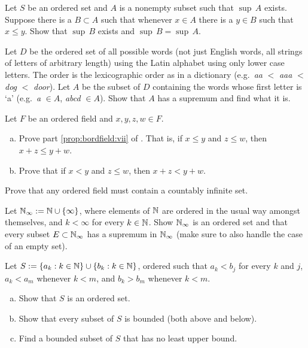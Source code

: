 \begin{exercise} \label{exercise:dominatingb}
Let $S$ be an ordered set and
$A$ is a nonempty subset such that $\sup \, A$ exists.  Suppose there
is a $B \subset A$ such that whenever $x \in A$ there is a $y \in B$
such that $x \leq y$.  Show that $\sup \, B$ exists and $\sup \, B = \sup \, A$.
\end{exercise}

\begin{exercise}
Let $D$ be the ordered set of all possible words (not just English words,
all strings of letters of arbitrary length)
using the Latin alphabet using only lower case letters.  The order is the
lexicographic order as in a dictionary (e.g.\ \emph{aa} $<$ \emph{aaa} $<$ \emph{dog} $<$ \emph{door}).
Let $A$ be the subset of $D$ containing the words whose
first letter is `a' (e.g.\ \emph{a} $\in A$, \emph{abcd} $\in A$).
Show that $A$ has a supremum and find what it is.
\end{exercise}

\begin{exercise}
Let $F$ be an ordered field and $x,y,z,w \in F$.
\begin{enumerate}[a)]
\item
Prove part \ref{prop:bordfield:vii} of .
That is,
if $x \leq y$ and $z \leq w$, then $x+z \leq y+w$.
\item
Prove that
if $x < y$ and $z \leq w$, then $x+z < y+w$.
\end{enumerate}
\end{exercise}

\begin{exercise}
Prove that any ordered field must contain a countably infinite set.
\end{exercise}

\begin{exercise}
Let ${\mathbb{N}}_{\infty} := {\mathbb{N}} \cup \{ \infty \}$, where elements of ${\mathbb{N}}$ are
ordered in the usual way amongst themselves,
and $k < \infty$ for every $k \in {\mathbb{N}}$.  Show ${\mathbb{N}}_{\infty}$ is an ordered set
and that every subset $E \subset {\mathbb{N}}_{\infty}$ has a supremum in
${\mathbb{N}}_{\infty}$ (make sure to also handle the case of an empty set).
\end{exercise}

\begin{exercise}
Let $S := \{ a_k : k \in {\mathbb{N}} \} \cup \{ b_k : k \in {\mathbb{N}} \}$, ordered such that
$a_k < b_j$ for every $k$ and $j$,
$a_k < a_m$ whenever $k < m$,
and $b_k > b_m$ whenever $k < m$.
\begin{enumerate}[a)]
\item
Show that $S$ is an ordered set.
\item
Show that every subset of $S$ is bounded (both above and below).
\item
Find a bounded subset of $S$ that has no least upper bound.
\end{enumerate}
\end{exercise}

